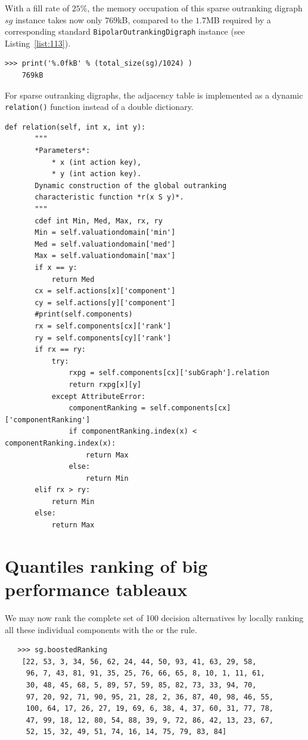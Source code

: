 With a fill rate of $25\%$, the memory occupation of this sparse outranking digraph $sg$ instance takes now only $769$kB, compared to the $1.7$MB required by a corresponding standard \texttt{BipolarOutrankingDigraph} instance (see Listing~\vref{list:113}).
\begin{lstlisting}
>>> print('%.0fkB' % (total_size(sg)/1024) )
    769kB
\end{lstlisting}

For sparse outranking digraphs, the adjacency table is implemented as a dynamic \texttt{relation()} function instead of a double dictionary.
\begin{lstlisting}[caption={The \texttt{relation()} function of a sparse outranking digraph},label=list:11.4,basicstyle=\ttfamily\scriptsize]
   def relation(self, int x, int y):
       """
       *Parameters*:
           * x (int action key),
           * y (int action key).
       Dynamic construction of the global outranking
       characteristic function *r(x S y)*.
       """
       cdef int Min, Med, Max, rx, ry
       Min = self.valuationdomain['min']
       Med = self.valuationdomain['med']
       Max = self.valuationdomain['max']
       if x == y:
           return Med
       cx = self.actions[x]['component']
       cy = self.actions[y]['component']
       #print(self.components)
       rx = self.components[cx]['rank']
       ry = self.components[cy]['rank']
       if rx == ry:
           try:
               rxpg = self.components[cx]['subGraph'].relation
               return rxpg[x][y]
           except AttributeError:
               componentRanking = self.components[cx]['componentRanking']
               if componentRanking.index(x) < componentRanking.index(x):
                   return Max
               else:
                   return Min
       elif rx > ry:
           return Min
       else:
           return Max
\end{lstlisting}

\section{Quantiles ranking of big performance tableaux}
\label{sec:11.4}

We may now rank the complete set of 100 decision alternatives by locally ranking all these individual components with the \Copeland or the \NetFlows rule.
\begin{lstlisting}
   >>> sg.boostedRanking
    [22, 53, 3, 34, 56, 62, 24, 44, 50, 93, 41, 63, 29, 58,
     96, 7, 43, 81, 91, 35, 25, 76, 66, 65, 8, 10, 1, 11, 61,
     30, 48, 45, 68, 5, 89, 57, 59, 85, 82, 73, 33, 94, 70,
     97, 20, 92, 71, 90, 95, 21, 28, 2, 36, 87, 40, 98, 46, 55,
     100, 64, 17, 26, 27, 19, 69, 6, 38, 4, 37, 60, 31, 77, 78,
     47, 99, 18, 12, 80, 54, 88, 39, 9, 72, 86, 42, 13, 23, 67,
     52, 15, 32, 49, 51, 74, 16, 14, 75, 79, 83, 84]
\end{lstlisting}


